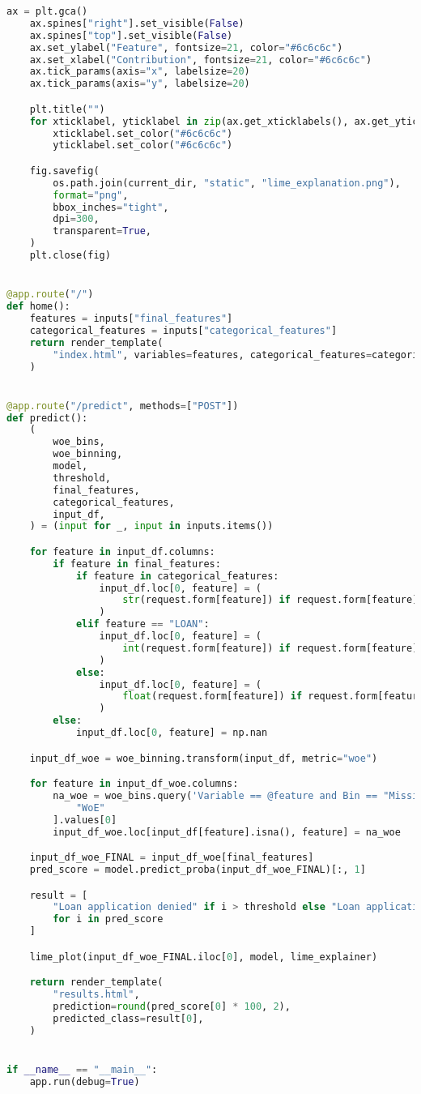 \begin{lstlisting}[language=Python, basicstyle=\footnotesize\ttfamily]
	ax = plt.gca()
	ax.spines["right"].set_visible(False)
	ax.spines["top"].set_visible(False)
	ax.set_ylabel("Feature", fontsize=21, color="#6c6c6c")
	ax.set_xlabel("Contribution", fontsize=21, color="#6c6c6c")
	ax.tick_params(axis="x", labelsize=20)
	ax.tick_params(axis="y", labelsize=20)

	plt.title("")
	for xticklabel, yticklabel in zip(ax.get_xticklabels(), ax.get_yticklabels()):
		xticklabel.set_color("#6c6c6c")
		yticklabel.set_color("#6c6c6c")

	fig.savefig(
		os.path.join(current_dir, "static", "lime_explanation.png"),
		format="png",
		bbox_inches="tight",
		dpi=300,
		transparent=True,
	)
	plt.close(fig)


@app.route("/")
def home():
	features = inputs["final_features"]
	categorical_features = inputs["categorical_features"]
	return render_template(
		"index.html", variables=features, categorical_features=categorical_features
	)


@app.route("/predict", methods=["POST"])
def predict():
	(
		woe_bins,
		woe_binning,
		model,
		threshold,
		final_features,
		categorical_features,
		input_df,
	) = (input for _, input in inputs.items())

	for feature in input_df.columns:
		if feature in final_features:
			if feature in categorical_features:
				input_df.loc[0, feature] = (
					str(request.form[feature]) if request.form[feature] else np.nan
				)
			elif feature == "LOAN":
				input_df.loc[0, feature] = (
					int(request.form[feature]) if request.form[feature] else np.nan
				)
			else:
				input_df.loc[0, feature] = (
					float(request.form[feature]) if request.form[feature] else np.nan
				)
		else:
			input_df.loc[0, feature] = np.nan

	input_df_woe = woe_binning.transform(input_df, metric="woe")

	for feature in input_df_woe.columns:
		na_woe = woe_bins.query('Variable == @feature and Bin == "Missing"')[
			"WoE"
		].values[0]
		input_df_woe.loc[input_df[feature].isna(), feature] = na_woe

	input_df_woe_FINAL = input_df_woe[final_features]
	pred_score = model.predict_proba(input_df_woe_FINAL)[:, 1]

	result = [
		"Loan application denied" if i > threshold else "Loan application approved"
		for i in pred_score
	]

	lime_plot(input_df_woe_FINAL.iloc[0], model, lime_explainer)

	return render_template(
		"results.html",
		prediction=round(pred_score[0] * 100, 2),
		predicted_class=result[0],
	)


if __name__ == "__main__":
	app.run(debug=True)	
\end{lstlisting}

